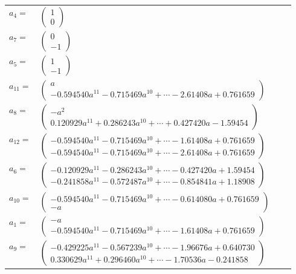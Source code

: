 \documentclass[1p]{elsarticle_modified}
\theoremstyle{definition}
\begin{document}
\begin{tabular}{m{7pt} m{180pt} m{7pt} m{180pt} }
\flushright $a_{4}=$&$\begin{pmatrix}1\\0\end{pmatrix}$ \\
\flushright $a_{7}=$&$\begin{pmatrix}0\\-1\end{pmatrix}$ \\
\flushright $a_{5}=$&$\begin{pmatrix}1\\-1\end{pmatrix}$ \\
\flushright $a_{11}=$&$\begin{pmatrix}a\\-0.594540 a^{11}-0.715469 a^{10}+\cdots-2.61408 a+0.761659\end{pmatrix}$ \\
\flushright $a_{8}=$&$\begin{pmatrix}- a^2\\0.120929 a^{11}+0.286243 a^{10}+\cdots+0.427420 a-1.59454\end{pmatrix}$ \\
\flushright $a_{12}=$&$\begin{pmatrix}-0.594540 a^{11}-0.715469 a^{10}+\cdots-1.61408 a+0.761659\\-0.594540 a^{11}-0.715469 a^{10}+\cdots-2.61408 a+0.761659\end{pmatrix}$ \\
\flushright $a_{6}=$&$\begin{pmatrix}-0.120929 a^{11}-0.286243 a^{10}+\cdots-0.427420 a+1.59454\\-0.241858 a^{11}-0.572487 a^{10}+\cdots-0.854841 a+1.18908\end{pmatrix}$ \\
\flushright $a_{10}=$&$\begin{pmatrix}-0.594540 a^{11}-0.715469 a^{10}+\cdots-0.614080 a+0.761659\\- a\end{pmatrix}$ \\
\flushright $a_{1}=$&$\begin{pmatrix}- a\\-0.594540 a^{11}-0.715469 a^{10}+\cdots-1.61408 a+0.761659\end{pmatrix}$ \\
\flushright $a_{9}=$&$\begin{pmatrix}-0.429225 a^{11}-0.567239 a^{10}+\cdots-1.96676 a+0.640730\\0.330629 a^{11}+0.296460 a^{10}+\cdots-1.70536 a-0.241858\end{pmatrix}$ \\

\end{tabular}
\end{document}
